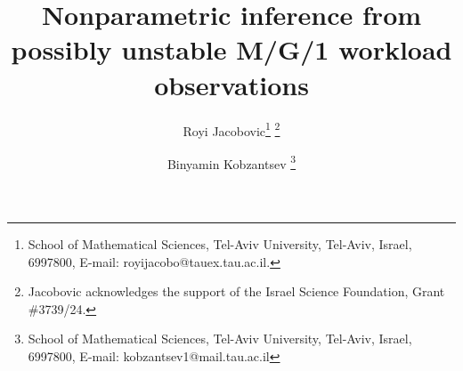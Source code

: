 \documentclass[12pt]{article}
\newcommand{\1}{\mathbf{1}}
\begin{document}
\setlength{\baselineskip}{20pt}

\title{Nonparametric inference from possibly unstable M/G/1 workload observations}

\author{Royi Jacobovic\footnote{School of Mathematical Sciences, Tel-Aviv University, Tel-Aviv, Israel, 6997800, E-mail: royijacobo@tauex.tau.ac.il.} \footnote{Jacobovic acknowledges the support of the Israel Science Foundation, Grant \#3739/24.} \and Binyamin Kobzantsev \footnote{School of Mathematical Sciences, Tel-Aviv University, Tel-Aviv, Israel, 6997800, E-mail: kobzantsev1@mail.tau.ac.il}}
\maketitle

\end{document}
